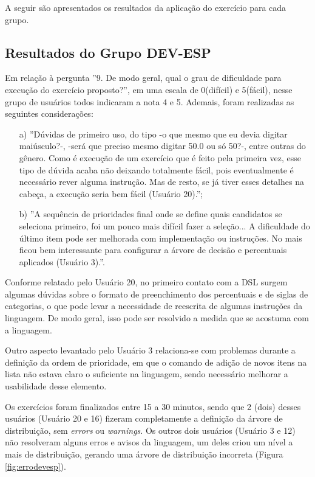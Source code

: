 A seguir são apresentados os resultados da aplicação do exercício para cada grupo.


\subsection{Resultados do Grupo DEV-ESP}
\label{subsec:devesp}

Em relação à pergunta ''9. De modo geral, qual o grau de dificuldade para execução do exercício proposto?'', em uma escala de 0(difícil) e 5(fácil), nesse grupo de usuários todos indicaram a nota 4 e 5. Ademais, foram realizadas as seguintes considerações:

\begin{enumerate}
    \item [a)] ''Dúvidas de primeiro uso, do tipo -o que  mesmo que eu devia digitar maiúsculo?-, -será que preciso mesmo digitar 50.0 ou só 50?-,  entre outras do gênero. Como é execução de um exercício que é feito pela primeira vez, esse tipo de dúvida acaba não deixando totalmente fácil, pois eventualmente é necessário rever alguma instrução. Mas de resto, se já tiver esses detalhes na cabeça, a execução seria bem fácil (Usuário 20).'';
    
    \item[b)] ''A sequência de prioridades final onde se define quais candidatos se seleciona primeiro, foi um pouco mais difícil fazer a seleção... A dificuldade do último item pode ser melhorada com implementação ou instruções. No mais ficou bem interessante para configurar a árvore de decisão e percentuais aplicados (Usuário 3).''.
\end{enumerate}

Conforme relatado pelo Usuário 20, no primeiro contato com a DSL surgem algumas dúvidas sobre o formato de preenchimento dos percentuais e de siglas de categorias, o que pode levar a necessidade de reescrita de algumas instruções da linguagem. De modo geral, isso pode ser resolvido a medida que se acostuma com a linguagem.

Outro aspecto levantado pelo Usuário 3 relaciona-se com problemas durante a definição da ordem de prioridade, em que o comando de adição de novos itens na lista não estava claro o suficiente na linguagem, sendo necessário melhorar a usabilidade desse elemento.

Os exercícios foram finalizados entre 15 a 30 minutos, sendo que 2 (dois) desses usuários (Usuário 20 e 16) fizeram completamente a definição da árvore de distribuição, sem \textit{errors} ou \textit{warnings}. Os outros dois usuários (Usuário 3 e 12) não resolveram alguns erros e avisos da linguagem, um deles criou um nível a mais de distribuição, gerando uma árvore de distribuição incorreta (Figura \ref{fig:errodevesp}). 

